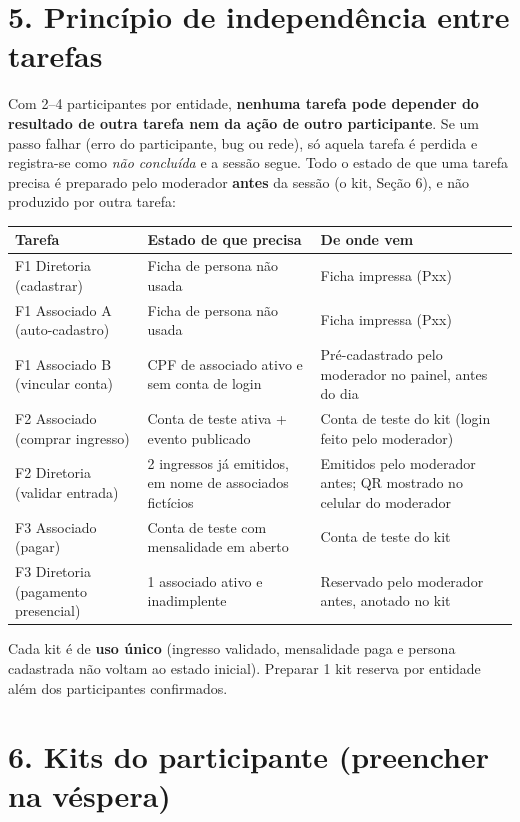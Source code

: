 \documentclass[11pt,a4paper]{article}
\begin{document}
\section*{5. Princípio de independência entre tarefas}

Com 2--4 participantes por entidade, \textbf{nenhuma tarefa pode depender do resultado de outra
tarefa nem da ação de outro participante}. Se um passo falhar (erro do participante, bug ou
rede), só aquela tarefa é perdida e registra-se como \textit{não concluída} e a sessão segue.
Todo o estado de que uma tarefa precisa é preparado pelo moderador \textbf{antes} da sessão (o kit,
Seção 6), e não produzido por outra tarefa:

\begin{center}
\small
\begin{longtable}{p{4cm}p{5.3cm}p{4.7cm}}
\toprule
\textbf{Tarefa} & \textbf{Estado de que precisa} & \textbf{De onde vem} \\
\midrule
\endhead
F1 Diretoria (cadastrar) & Ficha de persona não usada & Ficha impressa (Pxx) \\
F1 Associado A (auto-cadastro) & Ficha de persona não usada & Ficha impressa (Pxx) \\
F1 Associado B (vincular conta) & CPF de associado ativo e sem conta de login & Pré-cadastrado
  pelo moderador no painel, antes do dia \\
F2 Associado (comprar ingresso) & Conta de teste ativa + evento publicado & Conta de teste do kit
  (login feito pelo moderador) \\
F2 Diretoria (validar entrada) & 2 ingressos já emitidos, em nome de associados fictícios &
  Emitidos pelo moderador antes; QR mostrado no celular do moderador \\
F3 Associado (pagar) & Conta de teste com mensalidade em aberto & Conta de teste do kit \\
F3 Diretoria (pagamento presencial) & 1 associado ativo e inadimplente & Reservado pelo moderador
  antes, anotado no kit \\
\bottomrule
\end{longtable}
\end{center}

Cada kit é de \textbf{uso único} (ingresso validado, mensalidade paga e persona cadastrada não
voltam ao estado inicial). Preparar 1 kit reserva por entidade além dos participantes confirmados.

\section*{6. Kits do participante (preencher na véspera)}
\end{document}
